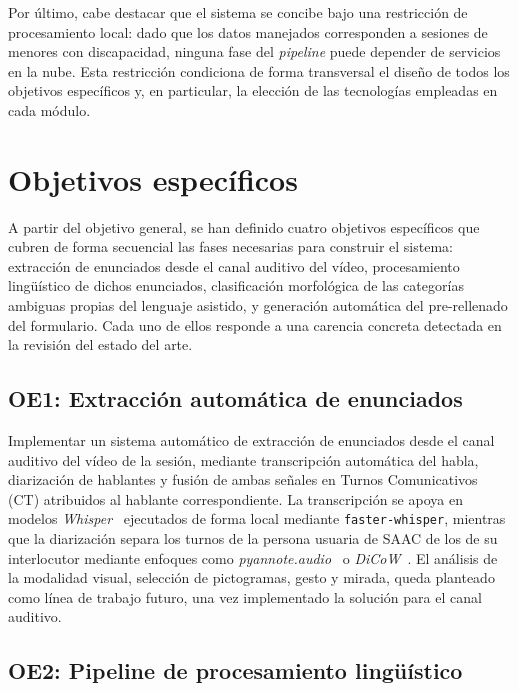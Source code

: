 Por último, cabe destacar que el sistema se concibe bajo una restricción de procesamiento
local: dado que los datos manejados corresponden a sesiones de menores con discapacidad,
ninguna fase del \emph{pipeline} puede depender de servicios en la nube. 
Esta restricción condiciona de forma transversal el diseño de todos los objetivos específicos y, 
en particular, la elección de las tecnologías empleadas en cada módulo.

\section{Objetivos específicos}

A partir del objetivo general, se han definido cuatro objetivos específicos que
cubren de forma secuencial las fases necesarias para construir el sistema: extracción de
enunciados desde el canal auditivo del vídeo, procesamiento lingüístico de dichos
enunciados, clasificación morfológica de las categorías ambiguas propias del lenguaje
asistido, y generación automática del pre-rellenado del formulario. Cada uno de ellos
responde a una carencia concreta detectada en la revisión del estado del arte.

\subsection{OE1: Extracción automática de enunciados}

Implementar un sistema automático de extracción de enunciados desde el canal auditivo del
vídeo de la sesión, mediante transcripción automática del habla, diarización de hablantes
y fusión de ambas señales en Turnos Comunicativos (CT) atribuidos al hablante
correspondiente. La transcripción se apoya en modelos \emph{Whisper}~\cite{whisper_radford2023}
ejecutados de forma local mediante \texttt{faster-whisper}, mientras que la diarización
separa los turnos de la persona usuaria de SAAC de los de su interlocutor mediante
enfoques como \emph{pyannote.audio}~\cite{pyannote_plaquet2023} o
\emph{DiCoW}~\cite{dicow_diarization}.
El análisis de la modalidad visual, selección de pictogramas, gesto y mirada, queda planteado
como línea de trabajo futuro, una vez implementado la solución para el canal auditivo.

\subsection{OE2: Pipeline de procesamiento lingüístico}

